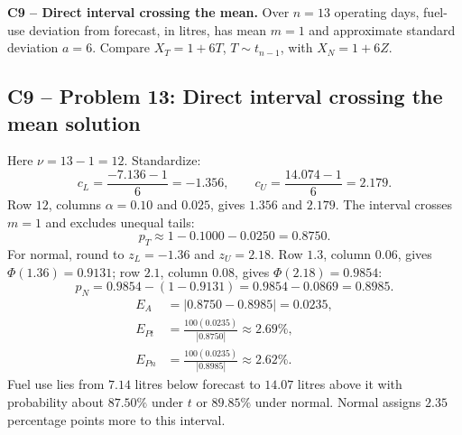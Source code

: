 {
\textbf{C9 -- Direct interval crossing the mean.} Over $n=13$ operating days, fuel-use deviation from forecast, in litres, has mean $m=1$ and approximate standard deviation $a=6$. Compare $X_T=1+6T$, $T\sim t_{n-1}$, with $X_N=1+6Z$.
\label{sol:q13}
\subsection*{C9 -- Problem 13: Direct interval crossing the mean solution }
Here $\nu=13-1=12$. Standardize:
\[
 c_L=\frac{-7.136-1}{6}=-1.356,\qquad c_U=\frac{14.074-1}{6}=2.179.
\]
Row $12$, columns $\alpha=0.10$ and $0.025$, gives $1.356$ and $2.179$.
The interval crosses $m=1$ and excludes unequal tails:
\[
 p_T\approx1-0.1000-0.0250=\boxed{0.8750}.
\]
For normal, round to $z_L=-1.36$ and $z_U=2.18$.
Row $1.3$, column $0.06$, gives $\Phi(1.36)=0.9131$; row $2.1$, column $0.08$, gives $\Phi(2.18)=0.9854$:
\[
 p_N=0.9854-(1-0.9131)=0.9854-0.0869=\boxed{0.8985}.
\]
\[
 \begin{aligned}
 E_A&=|0.8750-0.8985|=\boxed{0.0235},\\
 E_{Pt}&=\frac{100(0.0235)}{|0.8750|}\approx\boxed{2.69\%},\\
 E_{Pn}&=\frac{100(0.0235)}{|0.8985|}\approx\boxed{2.62\%}.
 \end{aligned}
\]
Fuel use lies from $7.14$ litres below forecast to $14.07$ litres above it with probability about $87.50\%$ under $t$ or $89.85\%$ under normal.
Normal assigns $2.35$ percentage points more to this interval.
\secInicio[sec:q13]
}

